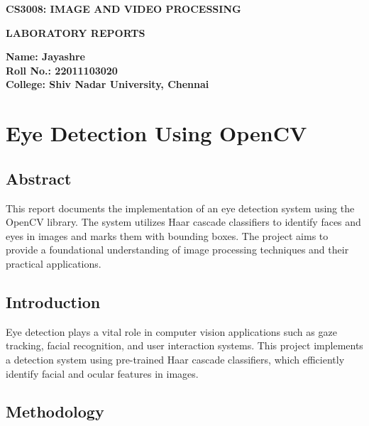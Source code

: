 \documentclass{report}
\begin{document}
\begin{titlepage}
\centering
\vspace*{\fill}
\huge{\textbf{CS3008: IMAGE AND VIDEO PROCESSING}}\\
\vspace{1 cm}

\begin{mdframed}
\centering
\LARGE{\textbf{LABORATORY REPORTS}}
\end{mdframed}

\vspace{3 cm}

\begin{flushleft}
\large{\textbf{Name: Jayashre\\
Roll No.: 22011103020 \\
College: Shiv Nadar University, Chennai\\}}

\vspace*{\fill}

\end{flushleft}
\end{titlepage}

\chapter{Eye Detection Using OpenCV} %

\section{Abstract}
This report documents the implementation of an eye detection system using the OpenCV library. The system utilizes Haar cascade classifiers to identify faces and eyes in images and marks them with bounding boxes. The project aims to provide a foundational understanding of image processing techniques and their practical applications.

\section{Introduction}
Eye detection plays a vital role in computer vision applications such as gaze tracking, facial recognition, and user interaction systems. This project implements a detection system using pre-trained Haar cascade classifiers, which efficiently identify facial and ocular features in images.

\section{Methodology}
\end{document}
